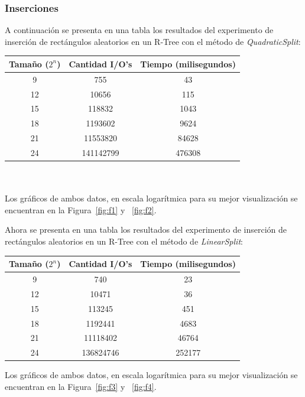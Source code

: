 \documentclass[letterpaper,12pt]{article}
\begin{document}
\subsubsection{Inserciones}
A continuación se presenta en una tabla los resultados del experimento de inserción de rectángulos aleatorios en un R-Tree con el método de \textit{QuadraticSplit}: \\
\begin{tabular}{|c|c|c|}
\hline
\textbf{Tama\~no ($2^n$)} & \textbf{Cantidad I/O's} & \textbf{Tiempo (milisegundos)} \\
\hline
9 & 755 & 43 \\
\hline
12 & 10656 & 115 \\
\hline
15 & 118832 & 1043 \\
\hline
18 & 1193602 & 9624 \\
\hline
21 & 11553820 & 84628 \\
\hline
24 & 141142799 & 476308 \\
\hline
\end{tabular}
\\ \\
Los gr\'aficos de ambos datos, en escala logar\'itmica para su mejor visualizaci\'on se encuentran en la Figura~\ref{fig:f1} y ~\ref{fig:f2}.

Ahora se presenta en una tabla los resultados del experimento de inserción de rectángulos aleatorios en un R-Tree con el método de \textit{LinearSplit}: \\
\begin{tabular}{|c|c|c|}
\hline
\textbf{Tama\~no ($2^n$)} & \textbf{Cantidad I/O's} & \textbf{Tiempo (milisegundos)} \\
\hline
9 & 740 & 23 \\
\hline
12 & 10471 & 36 \\
\hline
15 & 113245 & 451 \\
\hline
18 & 1192441 & 4683 \\
\hline
21 & 11118402 & 46764 \\
\hline
24 & 136824746 & 252177 \\
\hline
\end{tabular}

Los gr\'aficos de ambos datos, en escala logar\'itmica para su mejor visualizaci\'on se encuentran en la Figura~\ref{fig:f3} y ~\ref{fig:f4}.
\end{document}
